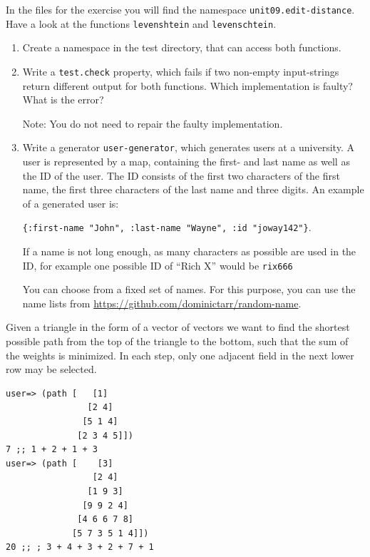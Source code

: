 \documentclass[11pt,a4paper]{article}
\begin{document}
\begin{exercise}

In the files for the exercise you will find the namespace \verb|unit09.edit-distance|.
Have a look at the functions \verb|levenshtein| and \verb|levenschtein|.

\begin{enumerate}[label=\alph*)]
    \item
    	Create a namespace in the test directory,
    	that can access both functions.

    \item
    	Write a \verb|test.check| property,
        which fails if two non-empty
        input-strings return different output for both functions.
        Which implementation is faulty?
        What is the error?
        
        Note: You do not need to repair the faulty implementation.

    \item
    	Write a generator \verb|user-generator|, which generates users at a university.
        A user is represented by a map,
        containing the first- and last name as well as the ID of the user.
        The ID consists of the first two characters of the first name,
        the first three characters of the last name and three digits.
        An example of a generated user is:
        
        \verb|{:first-name "John", :last-name "Wayne", :id "joway142"}|.

		If a name is not long enough, as many characters as possible are used in the ID,
		for example one possible ID of \enquote{Rich X} would be \verb|rix666|


		You can choose from a fixed set of names.
        For this purpose, you can use the name lists from
        \url{https://github.com/dominictarr/random-name}.
\end{enumerate}
\end{exercise}

\begin{exercise}
Given a triangle in the form of a vector of vectors we want to find the shortest possible path from the top of the triangle to the bottom, such that the sum of the weights is minimized. In each step, only one adjacent field in the next lower row may be selected.

\enlargethispage{2\baselineskip}
\begin{verbatim}
user=> (path [   [1]
                [2 4]
               [5 1 4]
              [2 3 4 5]])
7 ;; 1 + 2 + 1 + 3
user=> (path [    [3]
                 [2 4]
                [1 9 3]
               [9 9 2 4]
              [4 6 6 7 8]
             [5 7 3 5 1 4]])
20 ;; ; 3 + 4 + 3 + 2 + 7 + 1

\end{verbatim}
\end{exercise}
\end{document}
